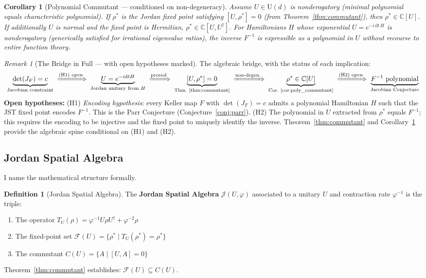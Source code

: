 \documentclass[12pt, letterpaper]{article}
\theoremstyle{plain}
\newtheorem{corollary}[theorem]{Corollary}
\theoremstyle{definition}
\newtheorem{definition}[theorem]{Definition}
\theoremstyle{remark}
\newtheorem{remark}[theorem]{Remark}
\begin{document}
\begin{corollary}[Polynomial Commutant --- conditioned on non-degeneracy]
\label{cor:poly_commutant}
Assume $U \in \mathrm{U}(d)$ is \textit{nonderogatory} (minimal polynomial equals characteristic
polynomial). If $\rho^*$ is the Jordan fixed point satisfying $[U, \rho^*] = 0$
(from Theorem~\ref{thm:commutant}), then $\rho^* \in \mathbb{C}[U]$.
If additionally $U$ is normal and the fixed point is Hermitian, $\rho^* \in \mathbb{C}[U, U^\dagger]$.
For Hamiltonians $H$ whose exponential $U = e^{-i\,\mathrm{d}t\,H}$ is nonderogatory
(generically satisfied for irrational eigenvalue ratios), the inverse $F^{-1}$ is
expressible as a polynomial in $U$ without recourse to entire function theory.
\end{corollary}

\begin{remark}[The Bridge in Full --- with open hypotheses marked]
The algebraic bridge, with the status of each implication:
\[
\underbrace{\det(J_F) = c}_{\text{Jacobian constraint}}
\;\xRightarrow{\text{(H1) open}}\;
\underbrace{U = e^{-i\mathrm{d}tH}}_{\text{Jordan unitary from }H}
\;\xRightarrow{\text{proved}}\;
\underbrace{[U, \rho^*] = 0}_{\text{Thm.~\ref{thm:commutant}}}
\;\xRightarrow{\text{non-degen.}}\;
\underbrace{\rho^* \in \mathbb{C}[U]}_{\text{Cor.~\ref{cor:poly_commutant}}}
\;\xRightarrow{\text{(H2) open}}\;
\underbrace{F^{-1} \text{ polynomial}}_{\text{Jacobian Conjecture}}
\]
\textbf{Open hypotheses:}
(H1) \textit{Encoding hypothesis}: every Keller map $F$ with $\det(J_F) = c$ admits
a polynomial Hamiltonian $H$ such that the JST fixed point encodes $F^{-1}$.
This is the Parr Conjecture (Conjecture~\ref{conj:parr}).
(H2) The polynomial in $U$ extracted from $\rho^*$ equals $F^{-1}$; this requires
the encoding to be injective and the fixed point to uniquely identify the inverse.
Theorem~\ref{thm:commutant} and Corollary~\ref{cor:poly_commutant} provide the
algebraic spine conditional on (H1) and (H2).
\end{remark}

\subsection{Jordan Spatial Algebra}

I name the mathematical structure formally.

\begin{definition}[Jordan Spatial Algebra]
The \textbf{Jordan Spatial Algebra} $\mathcal{J}(U, \varphi)$ associated to a
unitary $U$ and contraction rate $\varphi^{-1}$ is the triple:
\begin{enumerate}[nosep]
  \item The operator $T_U(\rho) = \varphi^{-1} U\rho U^\dagger + \varphi^{-2}\rho$
  \item The fixed-point set $\mathcal{F}(U) = \{\rho^* \mid T_U(\rho^*) = \rho^*\}$
  \item The commutant $C(U) = \{A \mid [U, A] = 0\}$
\end{enumerate}
Theorem~\ref{thm:commutant} establishes: $\mathcal{F}(U) \subseteq C(U)$.
\end{definition}
\end{document}
